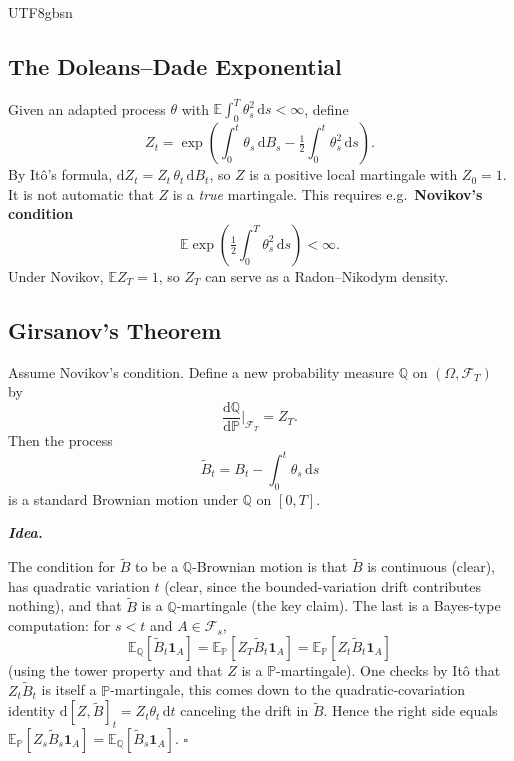 \documentclass{article}
\newenvironment{proof}[1][Proof]{%
  \par\smallskip\noindent\textit{\textbf{#1.}}\quad\ignorespaces
}{%
  \hfill$\square$\par\smallskip
}
\begin{document}
\begin{CJK*}{UTF8}{gbsn}
\subsection{The Doleans--Dade Exponential}

Given an adapted process $\theta$ with $\mathbb{E}\!\int_0^T \theta_s^2\,\mathrm{d}s<\infty$, define
\[
  Z_t=\exp\!\left(\int_0^t\theta_s\,\mathrm{d}B_s-\tfrac{1}{2}\!\int_0^t\theta_s^2\,\mathrm{d}s\right).
\]
By It\^o's formula, $\mathrm{d}Z_t=Z_t\,\theta_t\,\mathrm{d}B_t$, so $Z$ is a positive local martingale with $Z_0=1$. It is not automatic that $Z$ is a \emph{true} martingale. This requires e.g.\ \textbf{Novikov's condition}
\[
  \mathbb{E}\exp\!\left(\tfrac{1}{2}\!\int_0^T\theta_s^2\,\mathrm{d}s\right)<\infty.
\]
Under Novikov, $\mathbb{E}Z_T=1$, so $Z_T$ can serve as a Radon--Nikodym density.

\subsection{Girsanov's Theorem}

\begin{theorem}[Girsanov]\label{thm:girsanov}
Assume Novikov's condition. Define a new probability measure $\mathbb{Q}$ on $(\Omega,\mathcal{F}_T)$ by
\[
  \frac{\mathrm{d}\mathbb{Q}}{\mathrm{d}\mathbb{P}}\bigg|_{\mathcal{F}_T}=Z_T.
\]
Then the process
\[
  \widetilde{B}_t=B_t-\int_0^t\theta_s\,\mathrm{d}s
\]
is a standard Brownian motion under $\mathbb{Q}$ on $[0,T]$.
\end{theorem}

\begin{proof}[Idea]
The condition for $\widetilde{B}$ to be a $\mathbb{Q}$-Brownian motion is that $\widetilde{B}$ is continuous (clear), has quadratic variation $t$ (clear, since the bounded-variation drift contributes nothing), and that $\widetilde{B}$ is a $\mathbb{Q}$-martingale (the key claim). The last is a Bayes-type computation: for $s<t$ and $A\in\mathcal{F}_s$,
\[
  \mathbb{E}_\mathbb{Q}[\widetilde{B}_t\mathbf{1}_A]=\mathbb{E}_\mathbb{P}[Z_T\widetilde{B}_t\mathbf{1}_A]=\mathbb{E}_\mathbb{P}[Z_t\widetilde{B}_t\mathbf{1}_A]
\]
(using the tower property and that $Z$ is a $\mathbb{P}$-martingale). One checks by It\^o that $Z_t\widetilde{B}_t$ is itself a $\mathbb{P}$-martingale, this comes down to the quadratic-covariation identity $\mathrm{d}[Z,\widetilde{B}]_t=Z_t\theta_t\,\mathrm{d}t$ canceling the drift in $\widetilde{B}$. Hence the right side equals $\mathbb{E}_\mathbb{P}[Z_s\widetilde{B}_s\mathbf{1}_A]=\mathbb{E}_\mathbb{Q}[\widetilde{B}_s\mathbf{1}_A]$.
\end{proof}


\end{CJK*}
\end{document}
